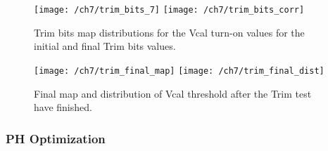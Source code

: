 \begin{figure}[!h]
  \centering
  \texttt{[image: /ch7/trim\_bits\_7]}
  \texttt{[image: /ch7/trim\_bits\_corr]}
  \caption[Trim test Trim bits]{Trim bits map distributions for the Vcal turn-on values for the initial  and final Trim bits values.}\label{fig:trim_bits}
\end{figure}

\begin{figure}[!h]
  \centering
  \texttt{[image: /ch7/trim\_final\_map]}
  \texttt{[image: /ch7/trim\_final\_dist]}
  \caption[Trim test final]{Final map and distribution of Vcal threshold after the Trim test have finished.}\label{fig:trim_final}
\end{figure}

\subsubsection{PH Optimization}


